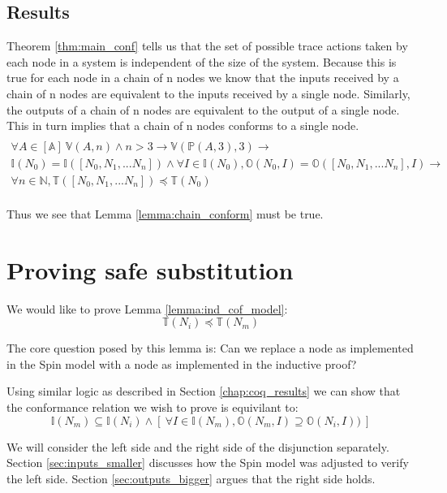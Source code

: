 \documentclass[runningheads]{llncs}
\newcommand{\action}{\mathds{A}}
\newcommand{\listaction}{[\action]}
\newcommand{\actsvalid}[2]{\mathds{V}(#1, #2)}
\newcommand{\projectsize}[2]{\mathds{P}(#1, #2)}
\newcommand{\inputset}[1]{\mathds{I}(#1)}
\newcommand{\outputset}[2]{\mathds{O}(#1, #2)}
\newcommand{\tracestruc}[1]{\mathds{T}(#1)}
\begin{document}
\subsection{Results}
Theorem \ref{thm:main_conf} tells us that the set of possible trace actions taken by each node in a system is independent of the size of the system. Because this is true for each node in a chain of n nodes we know that the inputs received by a chain of n nodes are equivalent to the inputs received by a single node. Similarly, the outputs of a chain of n nodes are equivalent to the output of a single node. This in turn implies that a chain of n nodes conforms to a single node.
\begin{multline*}
\\
\forall A \in \listaction\ \actsvalid{A}{n} \wedge n > 3 \longrightarrow \actsvalid{\projectsize{A}{3}}{3} \longrightarrow \\
\inputset{N_0} = \inputset{[N_0, N_1, ... N_n]}
\wedge 
\forall I \in \inputset{N_0}, \outputset{N_0}{I} = \outputset{[N_0, N_1, ... N_n]}{I} \longrightarrow \\
\forall n \in \mathds{N}, \tracestruc{[N_0, N_1, ... N_n]} \preceq \tracestruc{N_0} \\
\end{multline*}

Thus we see that Lemma \ref{lemma:chain_conform} must be true.

\section{Proving safe substitution}
\label{sec:inputs_map}
We would like to prove Lemma \ref{lemma:ind_cof_model}:
$$\tracestruc{N_i} \preceq \tracestruc{N_m}$$

The core question posed by this lemma is:
Can we replace a node as implemented in the Spin model with a node as implemented in the inductive proof?

Using similar logic as described in Section \ref{chap:coq_results} we can show that the conformance relation we wish to prove is equivilant to:
$$\inputset{N_m} \subseteq \inputset{N_i}
\wedge
\left[\  \forall I \in \inputset{N_m}, \outputset{N_m}{I} \supseteq \outputset{N_i}{I})\ \right] $$

We will consider the left side and the right side of the disjunction separately. 
Section \ref{sec:inputs_smaller} discusses how the Spin model was adjusted to verify the left side.
Section \ref{sec:outputs_bigger} argues that the right side holds.
\end{document}
